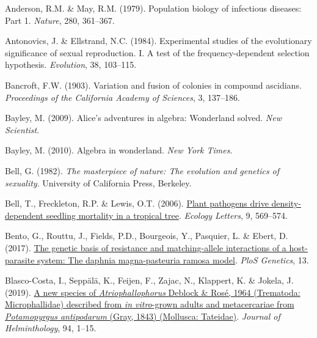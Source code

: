 \documentclass[
  letterpaper,
]{book}
\newlength{\cslhangindent}
\newenvironment{CSLReferences}[2] %
 {\begin{list}{}{%
  \setlength{\itemindent}{0pt}
  \setlength{\leftmargin}{0pt}
  \setlength{\parsep}{0pt}
  \ifodd #1
   \setlength{\leftmargin}{\cslhangindent}
   \setlength{\itemindent}{-1\cslhangindent}
  \fi
  \setlength{\itemsep}{#2\baselineskip}}}
 {\end{list}}
\begin{document}

\label{refs}
\begin{CSLReferences}{1}{0}
Anderson, R.M. \& May, R.M. (1979). Population biology of infectious
diseases: Part 1. \emph{Nature}, 280, 361--367.

Antonovics, J. \& Ellstrand, N.C. (1984). Experimental studies of the
evolutionary significance of sexual reproduction. I. A test of the
frequency-dependent selection hypothesis. \emph{Evolution}, 38,
103--115.

Bancroft, F.W. (1903). Variation and fusion of colonies in compound
ascidians. \emph{Proceedings of the {California Academy of Sciences}},
3, 137--186.

Bayley, M. (2009). Alice's adventures in algebra: Wonderland solved.
\emph{New Scientist}.

Bayley, M. (2010). Algebra in wonderland. \emph{New York Times}.

Bell, G. (1982). \emph{The masterpiece of nature: The evolution and
genetics of sexuality}. University of California Press, Berkeley.

Bell, T., Freckleton, R.P. \& Lewis, O.T. (2006).
\href{https://doi.org/10.1111/j.1461-0248.2006.00905.x}{Plant pathogens
drive density-dependent seedling mortality in a tropical tree}.
\emph{Ecology Letters}, 9, 569--574.

Bento, G., Routtu, J., Fields, P.D., Bourgeois, Y., Pasquier, L. \&
Ebert, D. (2017).
\href{https://doi.org/10.1371/journal.pgen.1006596}{The genetic basis of
resistance and matching-allele interactions of a host-parasite system:
The daphnia magna-pasteuria ramosa model}. \emph{PloS Genetics}, 13.

Blasco-Costa, I., Seppälä, K., Feijen, F., Zajac, N., Klappert, K. \&
Jokela, J. (2019). \href{https://doi.org/10.1017/S0022149X19000993}{A
new species of \emph{{A}triophallophorus} {Deblock \& Rosé}, 1964
({Trematoda: Microphallidae}) described from \emph{in vitro}-grown
adults and metacercariae from \emph{{P}otamopyrgus antipodarum} ({G}ray,
1843) ({Mollusca: Tateidae})}. \emph{Journal of Helminthology}, 94,
1--15.


\end{CSLReferences}
\end{document}
